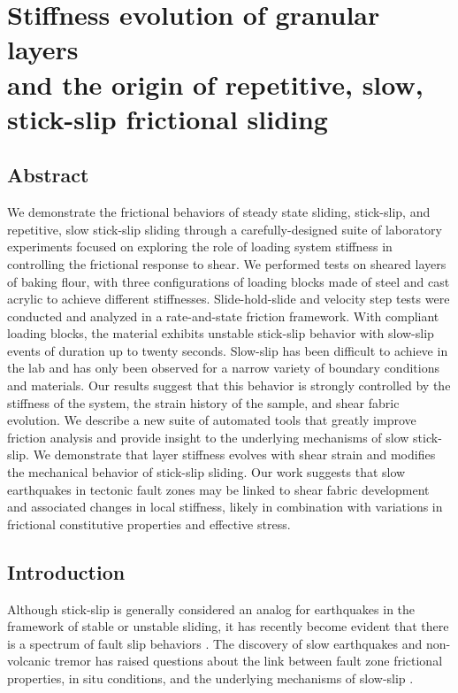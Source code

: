 \chapter{Stiffness evolution of granular layers \\and the origin of repetitive, slow, \\stick-slip frictional sliding}

\section{Abstract}
We demonstrate the frictional behaviors of steady state sliding, stick-slip, and
repetitive, slow stick-slip sliding through a carefully-designed suite of
laboratory experiments focused on exploring the role of loading system stiffness
in controlling the frictional response to shear. We performed tests on sheared
layers of baking flour, with three configurations of loading blocks made of
steel and cast acrylic to achieve different stiffnesses. Slide-hold-slide and
velocity step tests were conducted and analyzed in a rate-and-state friction
framework. With compliant loading blocks, the material exhibits unstable
stick-slip behavior with slow-slip events of duration up to twenty seconds.
Slow-slip has been difficult to achieve in the lab and has only been observed
for a narrow variety of boundary conditions and materials. Our results suggest
that this behavior is strongly controlled by the stiffness of the system, the
strain history of the sample, and shear fabric evolution. We describe a new
suite of automated tools that greatly improve friction analysis and provide
insight to the underlying mechanisms of slow stick-slip. We demonstrate that
layer stiffness evolves with shear strain and modifies the mechanical behavior
of stick-slip sliding. Our work suggests that slow earthquakes in tectonic fault
zones may be linked to shear fabric development and associated changes in local
stiffness, likely in combination with variations in frictional constitutive
properties and effective stress.

\section{Introduction}
Although stick-slip is generally considered an analog for earthquakes
\cite{Brace_Byerlee_1969,Johnson_2013} in the framework of stable or unstable
sliding, it has recently become evident that there is a spectrum of fault slip
behaviors \cite{peng2010integrated}.  The discovery of slow earthquakes and
non-volcanic tremor \cite{ikari2013slip,Beroza:2011jk,obara2002nonvolcanic,ide2007mechanism}
has raised questions about the link between fault zone frictional properties, in
situ conditions, and the underlying mechanisms of slow-slip
\cite{kaproth2013slow}.

